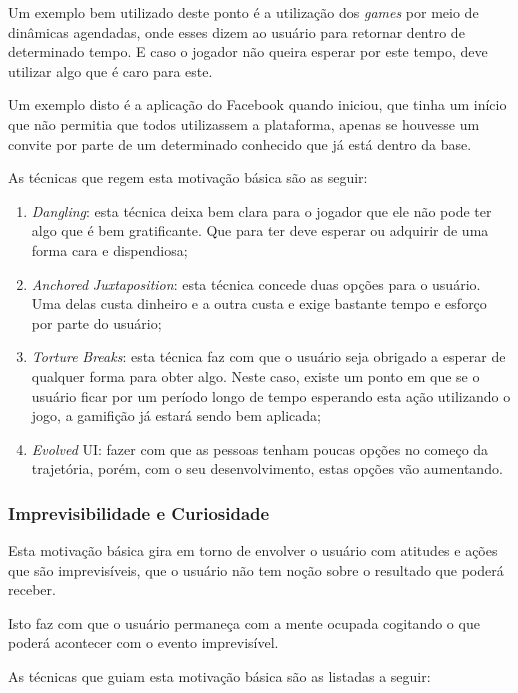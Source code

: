 Um exemplo bem utilizado deste ponto é a utilização dos \textit{games} por meio de dinâmicas
agendadas, onde esses dizem ao usuário para retornar dentro de determinado tempo.
E caso o jogador não queira esperar por este tempo, deve utilizar algo que é caro
para este.

Um exemplo disto é a aplicação do Facebook quando iniciou, que tinha um início que não permitia
que todos utilizassem a plataforma, apenas se houvesse um convite por parte de um
determinado conhecido que já está dentro da base.

As técnicas que regem esta motivação básica são as seguir:

\begin{enumerate}
    \item \textit{Dangling}: esta técnica deixa bem clara para o jogador que ele não pode
        ter algo que é bem gratificante. Que para ter deve esperar ou adquirir
        de uma forma cara e dispendiosa;
    \item \textit{Anchored} \textit{Juxtaposition}: esta técnica concede duas opções para o usuário.
        Uma delas custa dinheiro e a outra custa e exige bastante tempo e esforço
        por parte do usuário;
    \item \textit{Torture} \textit{Breaks}: esta técnica faz com que o usuário seja obrigado a esperar
        de qualquer forma para obter algo. Neste caso, existe um ponto em que
        se o usuário ficar por um período longo de tempo esperando esta ação
        utilizando o jogo, a gamifição já estará sendo bem aplicada;
    \item \textit{Evolved} UI: fazer com que as pessoas tenham poucas opções no começo da
        trajetória, porém, com o seu desenvolvimento, estas opções vão aumentando.
\end{enumerate}

\subsubsection{Imprevisibilidade e Curiosidade}
\label{sub:imprevisibilidadeecuriosidade}
Esta motivação básica gira em torno de envolver o usuário com atitudes e ações que são
imprevisíveis, que o usuário não tem noção sobre o resultado que poderá receber.

Isto faz com que o usuário permaneça com a mente ocupada cogitando o que poderá
acontecer com o evento imprevisível.

As técnicas que guiam esta motivação básica são as listadas a seguir:

